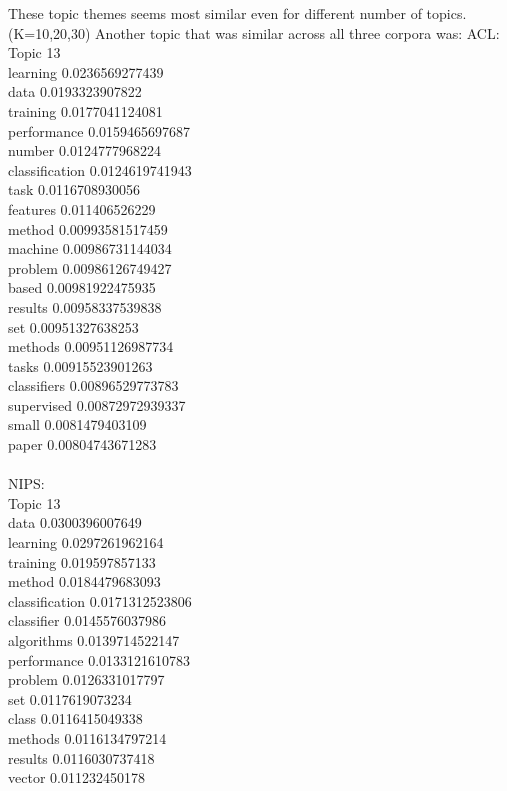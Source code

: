 \documentclass{article}
\begin{document}
{These topic themes seems most similar even for different number of topics. (K=10,20,30)
Another topic that was similar across all three corpora was:
ACL:\\
Topic 13\\
learning 0.0236569277439\\
data 0.0193323907822\\
training 0.0177041124081\\
performance 0.0159465697687\\
number 0.0124777968224\\
classification 0.0124619741943\\
task 0.0116708930056\\
features 0.011406526229\\
method 0.00993581517459\\
machine 0.00986731144034\\
problem 0.00986126749427\\
based 0.00981922475935\\
results 0.00958337539838\\
set 0.00951327638253\\
methods 0.00951126987734\\
tasks 0.00915523901263\\
classifiers 0.00896529773783\\
supervised 0.00872972939337\\
small 0.0081479403109\\
paper 0.00804743671283\\
\\
NIPS:\\
Topic 13\\
data 0.0300396007649\\
learning 0.0297261962164\\
training 0.019597857133\\
method 0.0184479683093\\
classification 0.0171312523806\\
classifier 0.0145576037986\\
algorithms 0.0139714522147\\
performance 0.0133121610783\\
problem 0.0126331017797\\
set 0.0117619073234\\
class 0.0116415049338\\
methods 0.0116134797214\\
results 0.0116030737418\\
vector 0.011232450178\\
}
\end{document}
